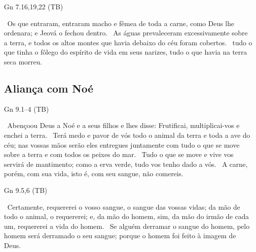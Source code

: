 \documentclass[12pt,aspectratio=169]{beamer}
\newcommand{\ver}[1]{%
    \raisebox{0.50ex}{%
        \scalebox{1.1}{%
            \pmb{\textbf{\textcolor{BSpbg}{#1}}}%
        }%
    }%
}
\newcommand{\QUOTE}[1]{%
    \par\noindent\hspace*{0.05\linewidth}%
    \begin{minipage}{0.9\linewidth}%
        \linespread{1.35}\large{#1}%
    \end{minipage}%
}
\newcommand{\RED}[1]{{\textcolor{TXred}{#1}}}
\newcommand{\ORA}[1]{{\textcolor{TXred!50!TXyel}{#1}}}
\newcommand{\YEL}[1]{{\textcolor{TXyel}{#1}}}
\newcommand{\GRE}[1]{{\textcolor{TXgre}{#1}}}
\newcommand{\CYA}[1]{{\textcolor{TXcya}{#1}}}
\begin{document}
    \begin{frame}{Gn 7.16,19,22 (TB)}
        \QUOTE{%
            \ver{7.16}~Os que entraram, entraram macho e fêmea de toda a carne, como Deus lhe
            ordenara; \YEL{e Jeová o fechou dentro}.
            \ver{7.19}~As águas prevaleceram excessivamente sobre a terra, e \YEL{todos} os
            altos \YEL{montes} que havia debaixo do céu foram \YEL{cobertos}.
            \ver{7.22}~\YEL{tudo} o que tinha o \GRE{fôlego do espírito de vida em seus
            narizes}, tudo o que havia na terra seca \RED{morreu}.
        }
    \end{frame}

    \subsection{Aliança com Noé}

    \begin{frame}{Gn 9.1--4 (TB)}
        \QUOTE{%
            \ver{1}~Abençoou Deus a Noé e a seus filhos e lhes disse: \YEL{Frutificai,
            multiplicai-vos e enchei a terra}.
            \ver{2}~Terá \ORA{medo e pavor de vós todo o animal da terra e toda a ave do céu};
            nas vossas mãos serão eles entregues juntamente com tudo o que se move sobre a terra
            e com todos os peixes do mar.
            \ver{3}~Tudo o que se move e vive vos servirá de mantimento; \YEL{como a erva verde,
            tudo vos tenho dado a vós}.
            \ver{4}~A carne, porém, com sua vida, isto é, com seu \RED{sangue, não comereis}.
        }
    \end{frame}

    \begin{frame}{Gn 9.5,6 (TB)}
        \QUOTE{%
            \ver{5}~\YEL{Certamente, requererei o vosso sangue}, o sangue das vossas vidas;
            \ORA{da mão de todo o animal, o requererei}; e, \RED{da mão do homem}, sim, da mão
            do irmão de cada um, requererei a vida do homem.
            \ver{6}~\YEL{Se alguém derramar o sangue do homem}, \GRE{pelo homem será derramado o
            seu sangue}; porque \CYA{o homem foi feito à imagem de Deus}.
        }
    \end{frame}
\end{document}
